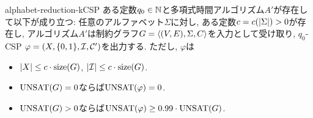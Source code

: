 \begin{lemma}{}{alphabet-reduction-kCSP}
  ある定数$q_0\in\mathbb{N}$と多項式時間アルゴリズム$A'$が存在して以下が成り立つ:
  任意のアルファベット$\Sigma$に対し, ある定数$c=c(\abs{\Sigma})>0$が存在し,
  アルゴリズム$A'$は制約グラフ$G=\langle(V,E),\Sigma,C\rangle$を入力として受け取り,
  $q_0$-CSP $\varphi=(X,\{0,1\},\mathcal{I},\mathcal{C}')$を出力する.
  ただし, $\varphi$は
  \begin{itemize}
    \item $\abs{X} \le c\cdot\mathrm{size}(G)$, $\abs{\mathcal{I}} \le c\cdot\mathrm{size}(G)$.
    \item $\mathrm{UNSAT}(G)=0$ならば$\mathrm{UNSAT}(\varphi)=0$.
    \item $\mathrm{UNSAT}(G)>0$ならば$\mathrm{UNSAT}(\varphi) \ge 0.99\cdot\mathrm{UNSAT}(G)$.
  \end{itemize}
\end{lemma}
